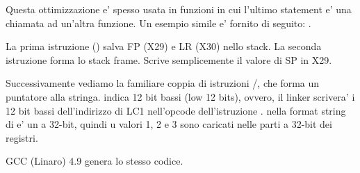 Questa ottimizzazione e' spesso usata in funzioni in cui l'ultimo statement e' una chiamata ad un'altra funzione.
Un esempio simile e' fornito di seguito:
.






La prima istruzione  () salva \ac{FP} (X29) e \ac{LR} (X30) nello stack.
La seconda istruzione  forma lo stack frame.
Scrive semplicemente il valore di \ac{SP} in X29.

Successivamente vediamo la familiare coppia di istruzioni /\ADD , che forma un puntatore alla stringa.
 indica 12 bit bassi (low 12 bits), ovvero, il linker scrivera' i 12 bit bassi dell'indirizzo di LC1 nell'opcode dell'istruzione \ADD .
 nella format string di \printf e' un \Tint a 32-bit, quindi u valori 1, 2 e 3 sono caricati nelle parti a 32-bit dei registri.

\Optimizing GCC (Linaro) 4.9 genera lo stesso codice.
